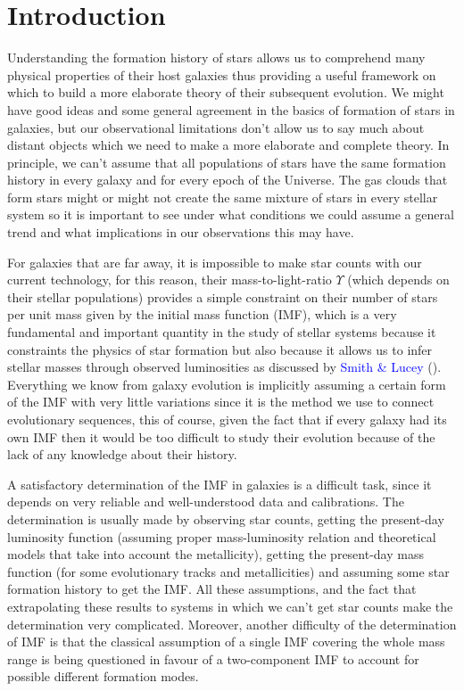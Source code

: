 \chapter{Introduction}

Understanding the formation history of stars allows us to comprehend many physical properties of their host galaxies thus providing a useful framework on which to build a more elaborate theory of their subsequent evolution. We might have good ideas and some general agreement in the basics of formation of stars in galaxies, but our observational limitations don't allow us to say much about distant objects which we need to make a more elaborate and complete theory. In principle, we can't assume that all populations of stars have the same formation history in every galaxy and for every epoch of the Universe. The gas clouds that form stars might or might not create the same mixture of stars in every stellar system so it is important to see under what conditions we could assume a general trend and what implications in our observations this may have.

For galaxies that are far away, it is impossible to make star counts with our current technology, for this reason, their mass-to-light-ratio $\Upsilon$ (which depends on their stellar populations) provides a simple constraint on their number of stars per unit mass given by the initial mass function (IMF), which is a very fundamental and important quantity in the study of stellar systems because it constraints the physics of star formation but also because it allows us to infer stellar masses through observed luminosities as discussed by \textcolor{blue}{Smith \& Lucey} (\citeyear{Reference7}). Everything we know from galaxy evolution is implicitly assuming a certain form of the IMF with very little variations since it is the method we use to connect evolutionary sequences, this of course, given the fact that if every galaxy had its own IMF then it would be too difficult to study their evolution because of the lack of any knowledge about their history. 

A satisfactory determination of the IMF in galaxies is a difficult task, since it depends on very reliable and well-understood data and calibrations. The determination is usually made by observing star counts, getting the present-day luminosity function (assuming proper mass-luminosity relation and theoretical models that take into account the metallicity), getting the present-day mass function (for some evolutionary tracks and metallicities) and assuming some star formation history to get the IMF. All these assumptions, and the fact that extrapolating these results to systems in which we can't get star counts make the determination very complicated. Moreover, another difficulty of the determination of IMF is that the classical assumption of a single IMF covering the whole mass range is being questioned in favour of a two-component IMF to account for possible different formation modes.

